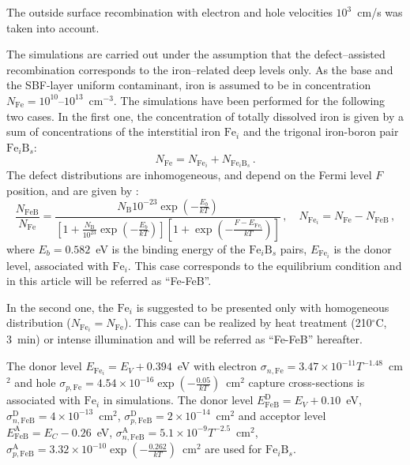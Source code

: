 \documentclass[a4paper,fleqn]{cas-sc}
\begin{document}
The outside surface recombination with electron and hole velocities $10^3$~cm/s was taken into account.

The simulations are carried out under the assumption that the defect–assisted recombination corresponds to the
iron–related deep levels only.
As the base and the SBF-layer uniform contaminant, iron is assumed to be in concentration
$N_{\mathrm{Fe}}=10^{10}$--$10^{13}$~cm$^{-3}$.
The simulations have been performed for the following two cases.
In the first one, the concentration of totally dissolved iron is given by a sum of
concentrations of the interstitial iron $\mathrm{Fe}_i$
and the trigonal iron-boron pair $\mathrm{Fe}_i\mathrm{B}_s$:
\begin{equation}\label{eqNFeB}
  N_{\mathrm{Fe}}=N_{\mathrm{Fe}_i}+N_{\mathrm{Fe}_i\mathrm{B}_s}\,.
\end{equation}
The defect distributions are inhomogeneous, and depend on the Fermi level $F$ position, and are given by
\citep{MurphyJAP2011,FeB:kinetic}:
\begin{equation}
\label{eqNFeB}
    \frac{N_{\mathrm{FeB}}}{N_{\mathrm{Fe}}}=\frac{N_\mathrm{B}10^{-23}\exp\left(-\frac{E_b}{kT}\right)}
     {\left[1+\frac{N_\mathrm{B}}{10^{23}}\exp\left(-\frac{E_b}{kT}\right)\right]\left[1+\exp\left(-\frac{F-E_{\mathrm{Fe}_i}}{kT}\right)\right]}\,,
     \quad N_{\mathrm{Fe}_i}=N_{\mathrm{Fe}}-N_{\mathrm{FeB}}\,,
\end{equation}
where
$E_b=0.582$~eV is the binding energy of the $\mathrm{Fe}_i\mathrm{B}_s$ pairs,
$E_{\mathrm{Fe}_i}$ is the donor level, associated with $\mathrm{Fe}_i$.
This case corresponds to the equilibrium condition and in this article will be referred as ``Fe-FeB''.

In the second one, the $\mathrm{Fe}_i$ is suggested to be presented only with homogeneous distribution ($N_{\mathrm{Fe}_i}=N_{\mathrm{Fe}}$).
This case can be realized by heat treatment (210$^\circ$C, 3~min) \cite{FeB_Zong} or intense illumination \cite{FeBLight2} and will be referred as ``Fe-FeB'' hereafter.

The donor level $E_{\mathrm{Fe}_i} = E_V+0.394$~eV
with electron $\sigma_{n,{\mathrm{Fe}}}=3.47\times10^{-11}T^{-1.48}$~cm$^2$ and
hole $\sigma_{p,{\mathrm{Fe}}}=4.54\times10^{-16}\exp\left(-\frac{0.05}{kT}\right)$~cm$^2$ capture cross-sections \cite{MurphyJAP2011,ROUGIEUX2018}
is associated with $\mathrm{Fe}_i$ in simulations.
The donor level $E_{\mathrm{FeB}}^\mathrm{D}= E_V+0.10$~eV,
$\sigma_{n,{\mathrm{FeB}}}^\mathrm{D}=4\times10^{-13}$~cm$^2$,
$\sigma_{p,{\mathrm{FeB}}}^\mathrm{D}=2\times10^{-14}$~cm$^2$
and acceptor level $E_{\mathrm{FeB}}^\mathrm{A}= E_C-0.26$~eV,
$\sigma_{n,{\mathrm{FeB}}}^\mathrm{A}=5.1\times10^{-9}T^{-2.5}$~cm$^2$,
$\sigma_{p,{\mathrm{FeB}}}^\mathrm{A}=3.32\times10^{-10}\exp\left(-\frac{0.262}{kT}\right)$~cm$^2$
\cite{Istratov1999,MurphyJAP2011,ROUGIEUX2018}
are used for $\mathrm{Fe}_i\mathrm{B}_s$.
\end{document}
